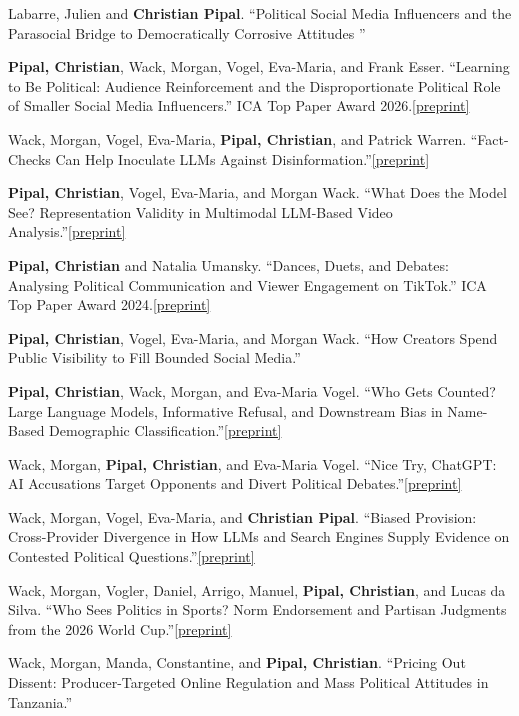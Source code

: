 \documentclass[11pt,a4paper]{article}
\newcommand{\preprint}[1]{\space\href{#1}{[preprint]}}
\begin{document}
\begin{enumerate}[leftmargin=2em, label={[\arabic*]}]
\item Labarre, Julien and \textbf{Christian Pipal}. ``Political Social Media Influencers and the Parasocial 
Bridge to Democratically Corrosive Attitudes ''
\item \textbf{Pipal, Christian}, Wack, Morgan, Vogel, Eva-Maria, and Frank Esser. ``Learning to Be Political: Audience Reinforcement and the Disproportionate Political Role of Smaller Social Media Influencers.'' ICA Top Paper Award 2026.\preprint{https://doi.org/10.31235/osf.io/rykgf_v1}
\item Wack, Morgan, Vogel, Eva-Maria, \textbf{Pipal, Christian}, and Patrick Warren. ``Fact-Checks Can Help Inoculate LLMs Against Disinformation.''\preprint{https://doi.org/10.31235/osf.io/nrs5z_v1}
\item \textbf{Pipal, Christian}, Vogel, Eva-Maria, and Morgan Wack. ``What Does the Model See? Representation Validity in Multimodal LLM-Based Video Analysis.''\preprint{https://arxiv.org/abs/2611.05181}
\item \textbf{Pipal, Christian} and Natalia Umansky. ``Dances, Duets, and Debates: Analysing Political Communication and Viewer Engagement on TikTok.'' ICA Top Paper Award 2024.\preprint{https://doi.org/10.31219/osf.io/g8dbu}
\item \textbf{Pipal, Christian}, Vogel, Eva-Maria, and Morgan Wack. ``How Creators Spend Public Visibility to Fill Bounded Social Media.''
\item \textbf{Pipal, Christian}, Wack, Morgan, and Eva-Maria Vogel. ``Who Gets Counted? Large Language Models, Informative Refusal, and Downstream Bias in Name-Based Demographic Classification.''\preprint{https://arxiv.org/abs/2611.06550}
\item Wack, Morgan, \textbf{Pipal, Christian}, and Eva-Maria Vogel. ``Nice Try, ChatGPT: AI Accusations Target Opponents and Divert Political Debates.''\preprint{https://doi.org/10.31235/osf.io/36mys_v1}
\item Wack, Morgan, Vogel, Eva-Maria,  and \textbf{Christian Pipal}. ``Biased Provision: Cross-Provider Divergence in How LLMs and Search Engines Supply Evidence on Contested Political Questions.''\preprint{https://doi.org/10.31235/osf.io/5g2tw_v1}
\item Wack, Morgan, Vogler, Daniel, Arrigo, Manuel, \textbf{Pipal, Christian}, and Lucas da Silva. ``Who Sees Politics in Sports? Norm Endorsement and Partisan Judgments from the 2026 World Cup.''\preprint{https://doi.org/10.31235/osf.io/gtjp4_v1}
\item Wack, Morgan, Manda, Constantine, and \textbf{Pipal, Christian}. ``Pricing Out Dissent: Producer-Targeted Online Regulation and Mass Political Attitudes in Tanzania.''


\end{enumerate}
\end{document}
